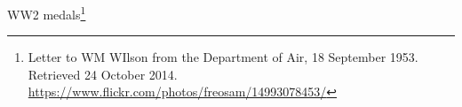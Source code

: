 
WW2 medals\footnote{Letter to WM WIlson from the Department of Air, 18 September 1953. Retrieved 24 October 2014. \url{https://www.flickr.com/photos/freosam/14993078453/}}
